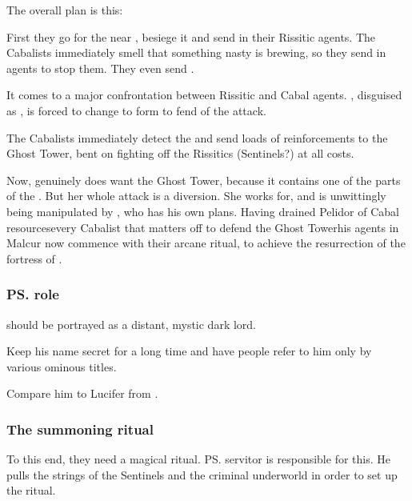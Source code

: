 \begin{garbage}
The overall plan is this:

First they go for the  near \hs{\Forklin}, besiege it and send in their Rissitic agents. 
The Cabalists immediately smell that something nasty is brewing, so they send in agents to stop them. 
They even send \banes. 

It comes to a major confrontation between Rissitic and Cabal agents. 
\hs{\Nzessuacrith}, disguised as \hs{\Takestsha}, is forced to change to \draconic{} form to fend of the \bane{} attack. 

The Cabalists immediately detect the \dragon{} and send loads of reinforcements to the Ghost Tower, bent on fighting off the Rissitics (Sentinels?) at all costs. 

Now, \Nzessuacrith{} genuinely does want the Ghost Tower, because it contains one of the parts of the \hs{\Haskelek}. But her whole attack is a diversion. She works for, and is unwittingly being manipulated by \Secherdamon, who has his own plans. Having drained Pelidor of Cabal resources\dash every Cabalist that matters off to defend the Ghost Tower\dash his agents in Malcur now commence with their arcane ritual, to achieve the resurrection of the fortress of \hs{\Nithdornazsh}. 





\subsubsection{\ps{\Secherdamon} role}
\Secherdamon{} should be portrayed as a distant, mystic dark lord. 

Keep his name secret for a long time and have people refer to him only by various ominous titles. 

Compare him to Lucifer from \FLuneNoire. 






\subsubsection{The summoning ritual}
To this end, they need a magical ritual. \ps{\Secherdamon} servitor  is responsible for this. He pulls the strings of the \Malcuric{} Sentinels and the criminal underworld in order to set up the ritual. 


\end{garbage}
